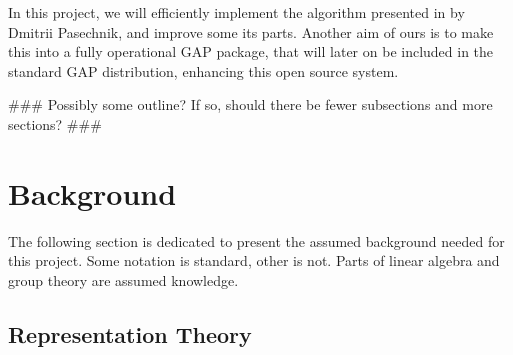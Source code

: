 \documentclass[11pt]{article}
\begin{document}
In this project, we will efficiently implement the algorithm presented
in \cite{Pas21} by Dmitrii Pasechnik, and improve some its parts. Another aim of
ours is to make this into a fully operational GAP package, that will later on
be included in the standard GAP distribution, enhancing this open source system.

\#\#\# Possibly some outline? If so, should there be fewer subsections and more
sections? \#\#\#

\newpage

\section{Background}

The following section is dedicated to present the assumed background needed for
this project. Some notation is standard, other is not. Parts of linear algebra
and group theory are assumed knowledge.

\subsection{Representation Theory}
\end{document}
